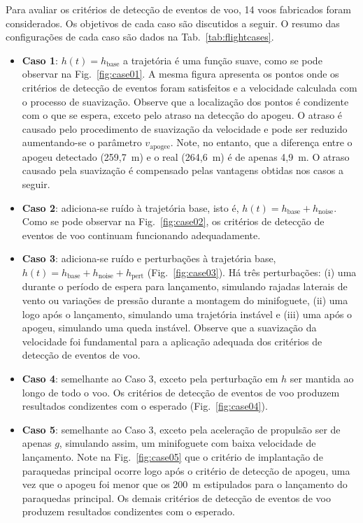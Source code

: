 \documentclass[12pt,a4paper]{article}
\begin{document}
Para avaliar os critérios de detecção de eventos de voo, 14 voos fabricados foram considerados. Os objetivos de cada caso são discutidos a seguir. O resumo das configurações de cada caso são dados na Tab.~\ref{tab:flightcases}.
\begin{itemize}
	\item \textbf{Caso 1}: $h(t)=h_\text{base}$ a trajetória é uma função suave, como se pode observar na Fig.~\ref{fig:case01}. A mesma figura apresenta os pontos onde os critérios de detecção de eventos foram satisfeitos e a velocidade calculada com o processo de suavização.  Observe que a localização dos pontos é condizente com o que se espera, exceto pelo atraso na detecção do apogeu. O atraso é causado pelo procedimento de suavização da velocidade e pode ser reduzido aumentando-se o parâmetro $v_\text{apogee}$. Note, no entanto, que a diferença entre o apogeu detectado (259,7~m) e o real (264,6~m) é de apenas 4,9~m. O atraso causado pela suavização é compensado pelas vantagens obtidas nos casos a seguir. 
	\item \textbf{Caso 2}: adiciona-se ruído à trajetória base, isto é, $h(t)=h_\text{base}+h_\text{noise}$. Como se pode observar na Fig.~\ref{fig:case02}, os critérios de detecção de eventos de voo continuam funcionando adequadamente.
	\item \textbf{Caso 3}: adiciona-se ruído e perturbações à trajetória base, $h(t)=h_\text{base}+h_\text{noise}+h_\text{pert}$ (Fig.~\ref{fig:case03}). Há três perturbações: (i) uma durante o período de espera para lançamento, simulando rajadas laterais de vento ou variações de pressão durante a montagem do minifoguete, (ii) uma logo após o lançamento, simulando uma trajetória instável e (iii) uma após o apogeu, simulando uma queda instável. Observe que a suavização da velocidade foi fundamental para a aplicação adequada dos critérios de detecção de eventos de voo.
	\item \textbf{Caso 4}: semelhante ao Caso 3, exceto pela perturbação em $h$ ser mantida ao longo de todo o voo. Os critérios de detecção de eventos de voo produzem resultados condizentes com o esperado (Fig.~\ref{fig:case04}).
	\item \textbf{Caso 5}: semelhante ao Caso 3, exceto pela aceleração de propulsão ser de apenas $g$, simulando assim, um minifoguete com baixa velocidade de lançamento. Note na Fig.~\ref{fig:case05} que o critério de implantação de paraquedas principal ocorre logo após o critério de detecção de apogeu, uma vez que o apogeu foi menor que os 200~m estipulados para o lançamento do paraquedas principal. Os demais critérios de detecção de eventos de voo produzem resultados condizentes com o esperado.

\end{itemize}
\end{document}
